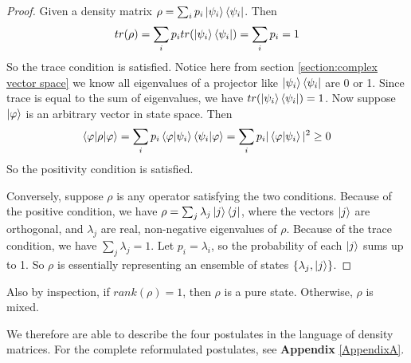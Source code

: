 \begin{proof}
Given a density matrix $\rho=\sum_i p_i \ket{\psi_i}\bra{\psi_i}$. Then
\begin{equation}
    tr(\rho)=\sum_i p_i tr(\ket{\psi_i}\bra{\psi_i})=\sum_i p_i =1
\end{equation}
So the trace condition is satisfied. Notice here from section \ref{section:complex vector space} we know all eigenvalues of a projector like $\ket{\psi_i}\bra{\psi_i}$ are 0 or 1. Since trace is equal to the sum of eigenvalues, we have $tr(\ket{\psi_i}\bra{\psi_i})=1$. Now suppose $\ket{\varphi}$ is an arbitrary vector in state space. Then
\begin{equation}
    \braket{\varphi|\rho|\varphi}=\sum_i p_i \braket{\varphi|\psi_i} \braket{\psi_i|\varphi}=\sum_i p_i |\braket{\varphi|\psi_i}|^2 \ge 0
\end{equation}
So the positivity condition is satisfied.

Conversely, suppose $\rho$ is any operator satisfying the two conditions. Because of the positive condition, we have $\rho=\sum_j \lambda_j \ket{j}\bra{j}$, where the vectors $\ket{j}$ are orthogonal, and $\lambda_j$ are real, non-negative eigenvalues of $\rho$. Because of the trace condition, we have $\sum_j \lambda_j=1$. Let $p_i=\lambda_i$, so the probability of each $\ket{j}$ sums up to 1. So $\rho$ is essentially representing an ensemble of states $\{\lambda_j, \ket{j}\}$.
\end{proof}

Also by inspection, if $rank(\rho)=1$, then $\rho$ is a pure state. Otherwise, $\rho$ is mixed.

We therefore are able to describe the four postulates in the language of density matrices. For the complete reformulated postulates, see \textbf{Appendix} \ref{AppendixA}.

 

